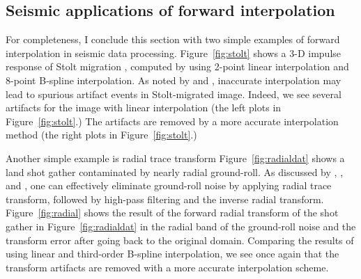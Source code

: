 \subsection{Seismic applications of forward interpolation}
For completeness, I conclude this section with two simple examples of
forward interpolation in seismic data processing.
Figure~\ref{fig:stolt} shows a 3-D impulse response of Stolt migration
\cite[]{GEO43-01-00230048}, computed by using 2-point linear
interpolation and 8-point B-spline interpolation. As noted by
\cite{Ronen.sep.30.95} and \cite{Harlan.sep.30.103},
inaccurate interpolation may lead to spurious artifact events in
Stolt-migrated image. Indeed, we see several artifacts for the image
with linear interpolation (the left plots in Figure~\ref{fig:stolt}.)
The artifacts are removed by a more accurate interpolation method (the
right plots in Figure~\ref{fig:stolt}.)


Another simple example is radial trace transform
\cite[]{Ottolini.sepphd.33} Figure~\ref{fig:radialdat} shows a land shot
gather contaminated by nearly radial ground-roll. As discussed by
\cite{Claerbout.sep.35.43}, \cite{SEG-1999-12041207}, and
\cite{Brown.sep.103.morgan1}, one can effectively eliminate
ground-roll noise by applying radial trace transform, followed by
high-pass filtering and the inverse radial transform.
Figure~\ref{fig:radial} shows the result of the forward radial
transform of the shot gather in Figure~\ref{fig:radialdat} in the
radial band of the ground-roll noise and the transform error after
going back to the original domain. Comparing the results of using
linear and third-order B-spline interpolation, we see once again that
the transform artifacts are removed with a more accurate interpolation
scheme.



